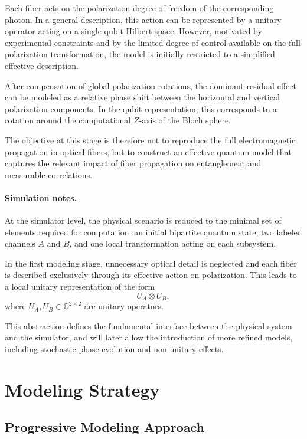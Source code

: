 \documentclass[a4paper]{article}
\begin{document}
Each fiber acts on the polarization degree of freedom of the corresponding photon. In a general description, this action can be represented by a unitary operator acting on a single-qubit Hilbert space. However, motivated by experimental constraints and by the limited degree of control available on the full polarization transformation, the model is initially restricted to a simplified effective description.

After compensation of global polarization rotations, the dominant residual effect can be modeled as a relative phase shift between the horizontal and vertical polarization components. In the qubit representation, this corresponds to a rotation around the computational \(Z\)-axis of the Bloch sphere.

The objective at this stage is therefore not to reproduce the full electromagnetic propagation in optical fibers, but to construct an effective quantum model that captures the relevant impact of fiber propagation on entanglement and measurable correlations.

\paragraph{Simulation notes.}
At the simulator level, the physical scenario is reduced to the minimal set of elements required for computation: an initial bipartite quantum state, two labeled channels \(A\) and \(B\), and one local transformation acting on each subsystem.

In the first modeling stage, unnecessary optical detail is neglected and each fiber is described exclusively through its effective action on polarization. This leads to a local unitary representation of the form
\[
U_A \otimes U_B,
\]
where \(U_A, U_B \in \mathbb{C}^{2 \times 2}\) are unitary operators.

This abstraction defines the fundamental interface between the physical system and the simulator, and will later allow the introduction of more refined models, including stochastic phase evolution and non-unitary effects.
\section{Modeling Strategy}

\subsection{Progressive Modeling Approach}
\end{document}
